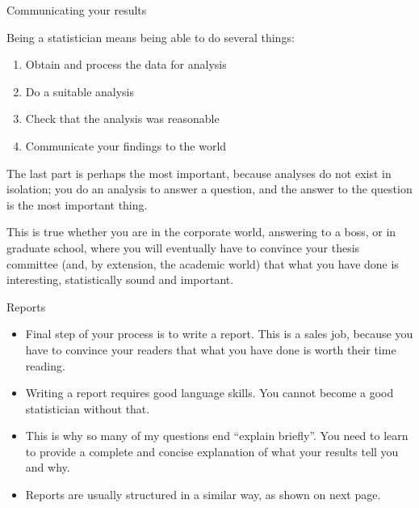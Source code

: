 \documentclass[ignorenonframetext,]{beamer}
\providecommand{\tightlist}{%
  \setlength{\itemsep}{0pt}\setlength{\parskip}{0pt}}
\begin{document}
\begin{frame}{Communicating your results}
\protect\hypertarget{communicating-your-results}{}

Being a statistician means being able to do several things:

\begin{enumerate}
\tightlist
\item
  Obtain and process the data for analysis
\item
  Do a suitable analysis
\item
  Check that the analysis was reasonable
\item
  Communicate your findings to the world
\end{enumerate}

The last part is perhaps the most important, because analyses do not
exist in isolation; you do an analysis to answer a question, and the
answer to the question is the most important thing.

This is true whether you are in the corporate world, answering to a
boss, or in graduate school, where you will eventually have to convince
your thesis committee (and, by extension, the academic world) that what
you have done is interesting, statistically sound and important.

\end{frame}

\begin{frame}{Reports}
\protect\hypertarget{reports}{}

\begin{itemize}
\tightlist
\item
  Final step of your process is to write a report. This is a sales job,
  because you have to convince your readers that what you have done is
  worth their time reading.
\item
  Writing a report requires good language skills. You cannot become a
  good statistician without that.
\item
  This is why so many of my questions end ``explain briefly''. You need
  to learn to provide a complete and concise explanation of what your
  results tell you and why.
\item
  Reports are usually structured in a similar way, as shown on next
  page.
\end{itemize}

\end{frame}
\end{document}
